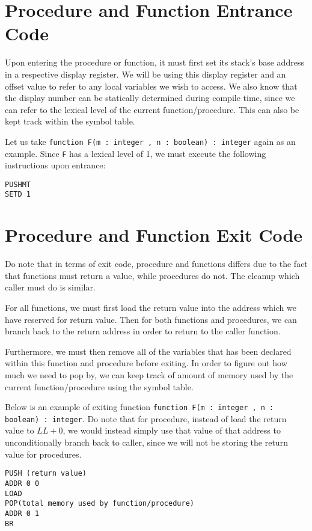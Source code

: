 \documentclass{article}
\begin{document}
\section{Procedure and Function Entrance Code}

Upon entering the procedure or function, it must first set its stack's base address in a respective display register. We will be using this display register and an offset value to refer to any local variables we wish to access. We also know that the display number can be statically determined during compile time, since we can refer to the lexical level of the current function/procedure. This can also be kept track within the symbol table.

Let us take {\tt function F(m : integer , n : boolean) : integer} again as an example. Since {\tt F} has a lexical level of 1, we must execute the following instructions upon entrance:

\begin{lstlisting}
PUSHMT
SETD 1
\end{lstlisting}


\section{Procedure and Function Exit Code} \label{exit}

Do note that in terms of exit code, procedure and functions differs due to the fact that functions must return a value, while procedures do not. The cleanup which caller must do is similar.

For all functions, we must first load the return value into the address which we have reserved for return value. Then for both functions and procedures, we can branch back to the return address in order to return to the caller function.

Furthermore, we must then remove all of the variables that has been declared within this function and procedure before exiting. In order to figure out how much we need to pop by, we can keep track of amount of memory used by the current function/procedure using the symbol table.

Below is an example of exiting function {\tt function F(m : integer , n : boolean) : integer}. Do note that for procedure, instead of load the return value to $LL + 0$, we would instead simply use that value of that address to unconditionally branch back to caller, since we will not be storing the return value for procedures.

\begin{lstlisting}
PUSH (return value)
ADDR 0 0
LOAD
POP(total memory used by function/procedure)
ADDR 0 1
BR
\end{lstlisting}
\end{document}
